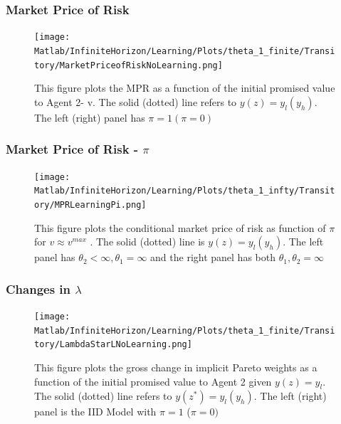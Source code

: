 \documentclass{beamer}
\theoremstyle{definition}
\begin{document}
\begin{frame} [label=MPRNoLearning]
\frametitle{Market Price of Risk}
\begin{figure}[htbp]
\centering
	  \texttt{[image: Matlab/InfiniteHorizon/Learning/Plots/theta\_1\_finite/Transitory/MarketPriceofRiskNoLearning.png]}

	\caption{\scriptsize{This figure plots the MPR as a function of the initial promised
value to Agent 2- v. The  solid (dotted) line refers to $y(z)=y_l (y_h)$. The
left (right) panel has $\pi=1 (\pi=0)$}}
	\label{fig:MPRNoLearning}
\end{figure} 
\hyperlink{ResultsComMarket}{\beamergotobutton{}}
\end{frame}
\begin{frame}[label=MPRLearning]
\frametitle{Market Price of Risk - $\pi$} 
\begin{figure}[htbp]
\centering
	  \texttt{[image: Matlab/InfiniteHorizon/Learning/Plots/theta\_1\_infty/Transitory/MPRLearningPi.png]}

	\caption{ \scriptsize{This figure plots the conditional market price of risk as function of $\pi$ for $v\approx v^{max}$ . The solid (dotted) line is $y(z)=y_l (y_h)$. The left panel has $\theta_2<\infty,\theta_1=\infty $ and the right panel has both $\theta_1,\theta_2=\infty$}}
 
	\label{fig:MPRLearningPi}
\end{figure} 
\hyperlink{ResultsComMarket}{\beamergotobutton{}}


\end{frame}

\begin{frame}[label=LambdaNoLearning]
\frametitle{Changes in $\lambda$}
\begin{figure}[htbp]
\centering
	  \texttt{[image: Matlab/InfiniteHorizon/Learning/Plots/theta\_1\_finite/Transitory/LambdaStarLNoLearning.png]}

	\caption{\scriptsize{This figure plots the gross change in implicit Pareto weights as a function 
of the initial promised value to Agent 2 given $y(z)=y_l$. The solid (dotted) line refers to
 $y(z^*)=y_l (y_h)$. The left (right) panel is the IID Model with $\pi=1$ ($\pi=0)$}}
	\label{fig:LambdaStarLStarNoLearning}
\end{figure} 
\hyperlink{ResultsComMarket}{\beamergotobutton{}}
\end{frame}
\end{document}
